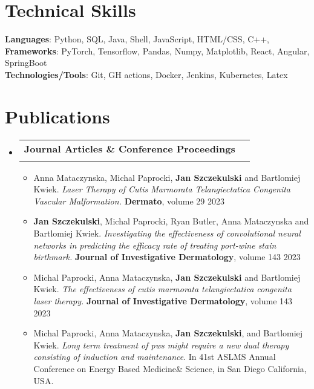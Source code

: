 \documentclass[letterpaper,11pt]{article}
\makeatletter
\newcommand{\resumeItem}[1]{
  \item\small{
    {#1 \vspace{-2pt}}
  }
}
\newcommand{\resumeSubheading}[4]{
  \vspace{-2pt}\item
    \begin{tabular*}{1.0\textwidth}[t]{l@{\extracolsep{\fill}}r}
      \textbf{#1} & \textbf{\small #2} \\
      \textit{\small#3} & \textit{\small #4} \\
    \end{tabular*}\vspace{-7pt}
}
\newcommand{\resumeSubHeadingListStart}{\begin{itemize}[leftmargin=0.0in, label={}]}
\newcommand{\resumeSubHeadingListEnd}{\end{itemize}}
\newcommand{\resumeItemListStart}{\begin{itemize}}
\newcommand{\resumeItemListEnd}{\end{itemize}\vspace{-5pt}}
\makeatother
\begin{document}
\section{Technical Skills}
 \begin{itemize}[leftmargin=0.15in, label={}]
    \small{\item{
     \textbf{Languages}{: Python, SQL, Java, Shell, JavaScript, HTML/CSS,  C++,} \\
     \textbf{Frameworks}{: PyTorch, Tensorflow, Pandas, Numpy, Matplotlib, React, Angular, SpringBoot} \\
     \textbf{Technologies/Tools}{: Git, GH actions, Docker, Jenkins, Kubernetes, Latex} \\
    }}
 \end{itemize}
 \vspace{-16pt}


\section{Publications}
    \resumeSubHeadingListStart
        \resumeSubheading{Journal Articles \& Conference Proceedings}{}{}{}
            \resumeItemListStart
                \resumeItem{Anna Mataczynska, Michal Paprocki, \textbf{Jan Szczekulski} and Bartlomiej Kwiek. \textit{Laser Therapy of Cutis Marmorata Telangiectatica Congenita Vascular Malformation.} \textbf{Dermato}, volume 29 2023}
                \vspace{3pt}
                \resumeItem{\textbf{Jan Szczekulski}, Michal Paprocki, Ryan Butler, Anna Mataczynska and Bartlomiej Kwiek. \textit{Investigating the effectiveness of convolutional neural networks in predicting the efficacy rate of treating port-wine stain birthmark.} \textbf{Journal of Investigative Dermatology}, volume 143 2023}
                \vspace{3pt}
                \resumeItem{Michal Paprocki, Anna Mataczynska, \textbf{Jan Szczekulski} and Bartlomiej Kwiek. \textit{The effectiveness of cutis marmorata telangiectatica congenita laser therapy.} \textbf{Journal of Investigative Dermatology}, volume 143 2023}
                \vspace{3pt}
                \resumeItem{Michal Paprocki, Anna Mataczynska, \textbf{Jan Szczekulski}, and Bartlomiej Kwiek. \textit{Long term treatment of pws might require a new dual therapy consisting of induction and maintenance}. In 41st ASLMS Annual Conference on Energy Based Medicine\& Science, in San Diego California, USA.}
            \resumeItemListEnd
    \resumeSubHeadingListEnd
\end{document}
